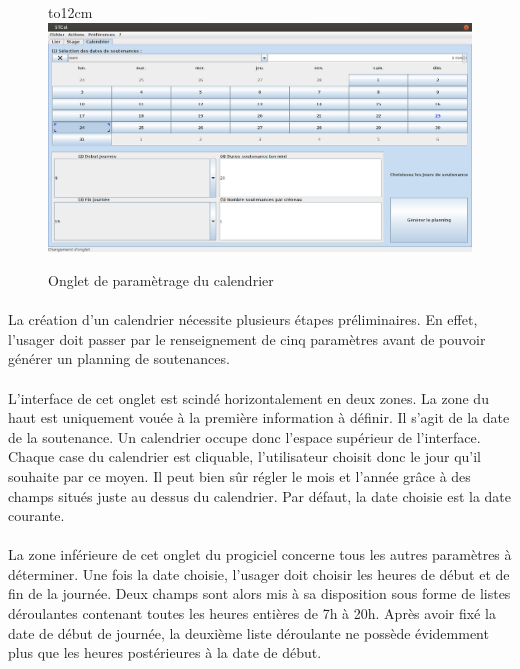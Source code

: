 \documentclass[a4paper,10pt]{report}
\begin{document}
		\begin{figure}[!h]
		\hbox to12cm{\hss\includegraphics[width=18cm]{Calendrier.png}\hss}
		\caption{Onglet de paramètrage du calendrier}
		\end{figure}
		
	      \paragraph{}  
		La création d'un calendrier nécessite plusieurs étapes préliminaires.
		En effet, l'usager doit passer par le renseignement de cinq paramètres avant de pouvoir générer un planning de soutenances.
		
	      \paragraph{}
		L'interface de cet onglet est scindé horizontalement en deux zones.
		La zone du haut est uniquement vouée à la première information à définir.
		Il s'agit de la date de la soutenance.
		Un calendrier occupe donc l'espace supérieur de l'interface.
		Chaque case du calendrier est cliquable, l'utilisateur choisit donc le jour qu'il souhaite par ce moyen.
		Il peut bien sûr régler le mois et l'année grâce à des champs situés juste au dessus du calendrier.
		Par défaut, la date choisie est la date courante.
		
	      \paragraph{}
		La zone inférieure de cet onglet du progiciel concerne tous les autres paramètres à déterminer.
		Une fois la date choisie, l'usager doit choisir les heures de début et de fin de la journée.
		Deux champs sont alors mis à sa disposition sous forme de listes déroulantes contenant toutes les heures entières de 7h à 20h.
		Après avoir fixé la date de début de journée, la deuxième liste déroulante ne possède évidemment plus que les heures postérieures à la date de début.
		
\end{document}
